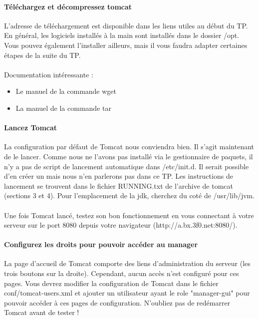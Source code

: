 \documentclass[12pt,a4paper]{article}
\begin{document}
\paragraph{Téléchargez et décompressez tomcat\\}
L'adresse de téléchargement est disponible dans les liens utiles au début du TP. En général, les logiciels installés à la main sont installés dans le dossier /opt. Vous pouvez également l'installer ailleurs, mais il vous faudra adapter certaines étapes de la suite du TP.

\paragraph{}
Documentation intéressante : 
\begin{itemize}
\item Le manuel de la commande wget
\item La manuel de la commande tar
\end{itemize}

\paragraph{Lancez Tomcat\\}
La configuration par défaut de Tomcat nous conviendra bien. Il s'agit maintenant de le lancer. Comme nous ne l'avons pas installé via le gestionnaire de paquets, il n'y a pas de script de lancement automatique dans /etc/init.d. Il serait possible d'en créer un mais nous n'en parlerons pas dans ce TP. Les instructions de lancement se trouvent dans le fichier RUNNING.txt de l'archive de tomcat (sections 3 et 4). Pour l'emplacement de la jdk, cherchez du coté de /usr/lib/jvm.

\paragraph{}
Une fois Tomcat lancé, testez son bon fonctionnement en vous connectant à votre serveur sur le port 8080 depuis votre navigateur (http://a.bx.3f0.net:8080/).

\paragraph{Configurez les droits pour pouvoir accéder au manager\\}
La page d'accueil de Tomcat comporte des liens d'administration du serveur (les trois boutons sur la droite). Cependant, aucun accès n'est configuré pour ces pages. Vous devrez modifier la configuration de Tomcat dans le fichier conf/tomcat-users.xml et ajouter un utilisateur ayant le role "manager-gui" pour pouvoir accéder à ces pages de configuration. N'oubliez pas de redémarrer Tomcat avant de tester !
\end{document}
